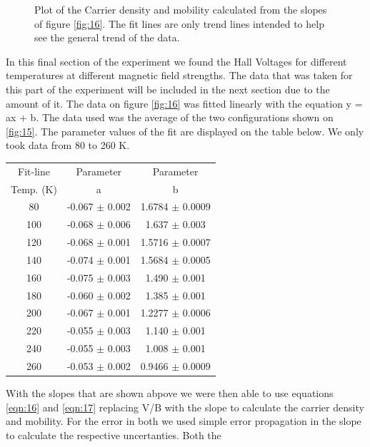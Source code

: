 \documentclass[twocolumn]{article}
\begin{document}
\begin{figure}
\begin{minipage}[t]{0.46\textwidth}
\caption{Plot of the Carrier density and mobility calculated from the slopes of 
figure \ref{fig:16}. The fit lines are only trend lines intended to help 
see the general trend of the data.}
\label{fig:17}
\end{minipage}
\end{figure}
In this final section of the experiment we found the Hall Voltages for 
different temperatures at different magnetic field strengths. The data that was 
taken for this part of the experiment will be included in the next section due 
to the amount of it. The data on figure \ref{fig:16} was fitted linearly with 
the equation y = ax + b. The data used was the average of the two 
configurations shown on \ref{fig:15}. The parameter values of the fit are 
displayed on the 
table below. We only took data from 80 to 260 K.
\begin{minipage}{\linewidth}
\Centering
\begin{tabular}{|c|c|c|}
\hline
Fit-line & Parameter & Parameter \\ Temp. (K) & a & b \\ \hline
80 & -0.067 $\pm$ 0.002 & 1.6784 $\pm$ 0.0009 \\ \hline 
100 & -0.068 $\pm$ 0.006 & 1.637 $\pm$ 0.003 \\ \hline 
120 & -0.068 $\pm$ 0.001 & 1.5716 $\pm$ 0.0007 \\ \hline 
140 & -0.074 $\pm$ 0.001 & 1.5684 $\pm$ 0.0005 \\ \hline 
160 & -0.075 $\pm$ 0.003 & 1.490 $\pm$ 0.001 \\ \hline 
180 & -0.060 $\pm$ 0.002 & 1.385 $\pm$ 0.001 \\ \hline 
200 & -0.067 $\pm$ 0.001 & 1.2277 $\pm$ 0.0006 \\ \hline 
220 & -0.055 $\pm$ 0.003 & 1.140 $\pm$ 0.001 \\ \hline 
240 & -0.055 $\pm$ 0.003 & 1.008 $\pm$ 0.001 \\ \hline 
260 & -0.053 $\pm$ 0.002 & 0.9466 $\pm$ 0.0009 \\ \hline 
\end{tabular}
\label{tbl:11}
\end{minipage}
With the slopes that are shown abpove we were then able to use equations 
\ref{eqn:16} and \ref{eqn:17} replacing V/B with the slope to calculate the 
carrier density and mobility. For the error in both we used simple error 
propagation in the slope to calculate the respective uncertanties. Both the 
\end{document}
